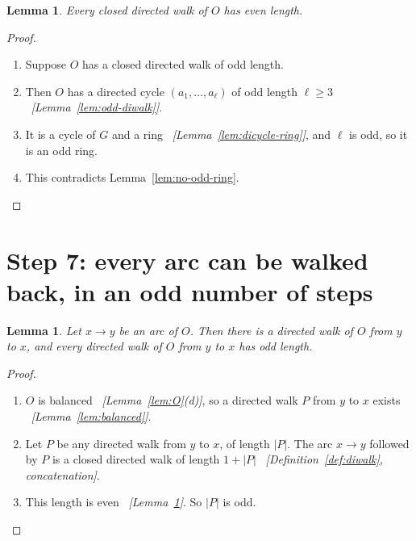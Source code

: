 \documentclass[11pt]{article}
\theoremstyle{plain}
\newtheorem{lemma}[theorem]{Lemma}
\theoremstyle{definition}
\theoremstyle{remark}
\newcommand{\why}[1]{\unskip\ \textit{[#1]}}
\newenvironment{steps}{\begin{enumerate}[label=(\arabic*),leftmargin=2.2em,itemsep=0.35em]}{\end{enumerate}}
\begin{document}
\begin{lemma}\label{lem:no-odd-closed}
Every closed directed walk of $O$ has even length.
\end{lemma}

\begin{proof}
\begin{steps}
  \item Suppose $O$ has a closed directed walk of odd length.
  \item Then $O$ has a directed cycle $(a_1,\dots,a_\ell)$ of odd length $\ell\ge 3$
    \why{Lemma~\ref{lem:odd-diwalk}}.
  \item It is a cycle of $G$ and a ring \why{Lemma~\ref{lem:dicycle-ring}}, and $\ell$ is odd, so
    it is an odd ring.
  \item This contradicts Lemma~\ref{lem:no-odd-ring}. \qedhere
\end{steps}
\end{proof}

\section{Step 7: every arc can be walked back, in an odd number of steps}\label{sec:step7}

\begin{lemma}\label{lem:return}
Let $x\to y$ be an arc of $O$. Then there is a directed walk of $O$ from $y$ to $x$, and every
directed walk of $O$ from $y$ to $x$ has odd length.
\end{lemma}

\begin{proof}
\begin{steps}
  \item $O$ is balanced \why{Lemma~\ref{lem:O}(d)}, so a directed walk $P$ from $y$ to $x$ exists
    \why{Lemma~\ref{lem:balanced}}.
  \item Let $P$ be any directed walk from $y$ to $x$, of length $|P|$. The arc $x\to y$ followed
    by $P$ is a closed directed walk of length $1+|P|$ \why{Definition~\ref{def:diwalk},
    concatenation}.
  \item This length is even \why{Lemma~\ref{lem:no-odd-closed}}. So $|P|$ is odd. \qedhere
\end{steps}
\end{proof}
\end{document}
